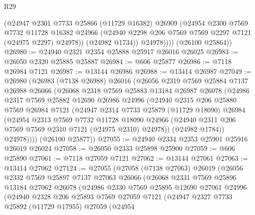 \begin{lexlean}{R29}
\begin{coremodule}
              (@24947
                @2301
                @7733
                @25866
                (@11729 @16382)
                @26909
                (@24954
                  @2300
                  @7569
                  @7732
                  @11728
                  @16382
                  @24966
                  (@24940 @2298 @206 @7569 @7569 @2297 @7121 (@24975 @2297) @24978))
                (@24982 @1734))
              @24978))))
      (@26100 @25864))
@26980 := @24940 @2321 @2354 @25888 @25917 @26016 @26025
@26983 := @26050 @2320 @25885 @25887
@26984 := @606 @25877
@26986 := @7118 @26984 @7121
@26987 := @13144 @26986
@26988 := @13414 @26987
@27049 := @26980
    (@26983
      (@7138 @26988)
      @26016
      (@26056
        @2319
        @7569
        @25884
        @7137
        @26988
        @26066
        (@26068
          @2318
          @7569
          @25883
          @13184
          @26987
          @26078
          (@24986
            @2317
            @7569
            @25882
            @12690
            @26986
            @24996
            (@24940
              @2315
              @206
              @25880
              @7569
              @26984
              @7121
              (@24947
                @2314
                @7733
                @25879
                (@11729 @18090)
                @26984
                (@24954
                  @2313
                  @7569
                  @7732
                  @11728
                  @18090
                  @24966
                  (@24940 @2311 @206 @7569 @7569 @2310 @7121 (@24975 @2310) @24978))
                (@24982 @1784))
              @24978))))
      (@26100 @25877))
@27055 := @24940 @2334 @2353 @25901 @25916 @26019 @26024
@27058 := @26050 @2333 @25898 @25900
@27059 := @606 @25890
@27061 := @7118 @27059 @7121
@27062 := @13144 @27061
@27063 := @13414 @27062
@27124 := @27055
    (@27058
      (@7138 @27063)
      @26019
      (@26056
        @2332
        @7569
        @25897
        @7137
        @27063
        @26066
        (@26068
          @2331
          @7569
          @25896
          @13184
          @27062
          @26078
          (@24986
            @2330
            @7569
            @25895
            @12690
            @27061
            @24996
            (@24940
              @2328
              @206
              @25893
              @7569
              @27059
              @7121
              (@24947
                @2327
                @7733
                @25892
                (@11729 @17955)
                @27059
                (@24954

\end{coremodule}
\end{lexlean}
